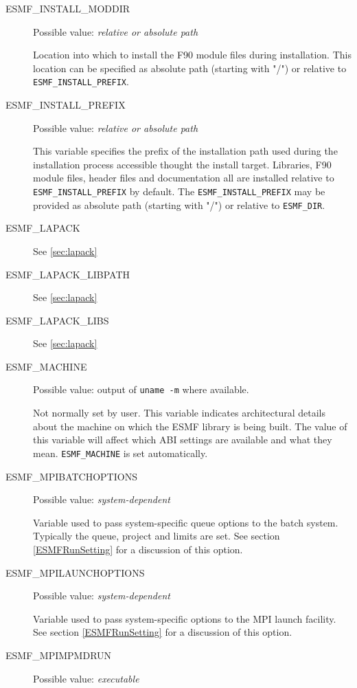 \begin{description}
\item[ESMF\_INSTALL\_MODDIR]
Possible value: {\em relative or absolute path}

Location into which to install the F90 module files during installation. This
location can be specified as absolute path (starting with "/") or relative to
{\tt ESMF\_INSTALL\_PREFIX}.

\item[ESMF\_INSTALL\_PREFIX]
Possible value: {\em relative or absolute path}

This variable specifies the prefix of the installation path used during the
installation process accessible thought the install target. Libraries, F90
module files, header files and documentation all are installed relative to
{\tt ESMF\_INSTALL\_PREFIX} by default. The {\tt ESMF\_INSTALL\_PREFIX} may be
provided as absolute path (starting with "/") or relative to {\tt ESMF\_DIR}.

\item[ESMF\_LAPACK]
See \ref{sec:lapack}

\item[ESMF\_LAPACK\_LIBPATH]
See \ref{sec:lapack}

\item[ESMF\_LAPACK\_LIBS]
See \ref{sec:lapack}

\item[ESMF\_MACHINE]
Possible value: output of {\tt uname -m} where available.

Not normally set by user. This variable indicates architectural details about
the machine on which the ESMF library is being built. The value of this 
variable will affect which ABI settings are available and what they mean. 
{\tt ESMF\_MACHINE} is set automatically.

\item[ESMF\_MPIBATCHOPTIONS]
Possible value: {\em system-dependent}

Variable used to pass system-specific queue options to the batch system. 
Typically the queue, project and limits are set.
See section \ref{ESMFRunSetting} for a discussion of this option.

\item[ESMF\_MPILAUNCHOPTIONS]
Possible value: {\em system-dependent}

Variable used to pass system-specific options to the MPI launch facility.
See section \ref{ESMFRunSetting} for a discussion of this option.

\item[ESMF\_MPIMPMDRUN]
Possible value: {\em executable}


\end{description}
